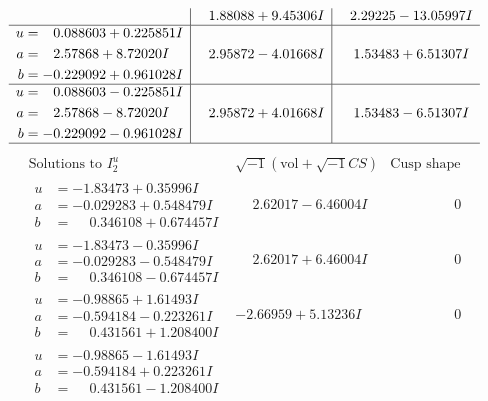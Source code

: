 \documentclass[1p]{elsarticle_modified}
\theoremstyle{definition}
\newcommand{\I}{\sqrt{-1}}
\begin{document}
$$\begin{array}{c|c|c}
 & \phantom{-}1.88088 + 9.45306 I & \phantom{-}2.29225 - 13.05997 I \\ \hline\begin{aligned}
u &= \phantom{-}0.088603 + 0.225851 I \\
a &= \phantom{-}2.57868 + 8.72020 I \\
b &= -0.229092 + 0.961028 I\end{aligned}
 & \phantom{-}2.95872 - 4.01668 I & \phantom{-}1.53483 + 6.51307 I \\ \hline\begin{aligned}
u &= \phantom{-}0.088603 - 0.225851 I \\
a &= \phantom{-}2.57868 - 8.72020 I \\
b &= -0.229092 - 0.961028 I\end{aligned}
 & \phantom{-}2.95872 + 4.01668 I & \phantom{-}1.53483 - 6.51307 I\\
 \hline 
 \end{array}$$\newpage$$\begin{array}{c|c|c}  
\text{Solutions to }I^u_{2}& \I (\text{vol} + \sqrt{-1}CS) & \text{Cusp shape}\\
 \hline 
\begin{aligned}
u &= -1.83473 + 0.35996 I \\
a &= -0.029283 + 0.548479 I \\
b &= \phantom{-}0.346108 + 0.674457 I\end{aligned}
 & \phantom{-}2.62017 - 6.46004 I & \phantom{-0.000000 } 0 \\ \hline\begin{aligned}
u &= -1.83473 - 0.35996 I \\
a &= -0.029283 - 0.548479 I \\
b &= \phantom{-}0.346108 - 0.674457 I\end{aligned}
 & \phantom{-}2.62017 + 6.46004 I & \phantom{-0.000000 } 0 \\ \hline\begin{aligned}
u &= -0.98865 + 1.61493 I \\
a &= -0.594184 - 0.223261 I \\
b &= \phantom{-}0.431561 + 1.208400 I\end{aligned}
 & -2.66959 + 5.13236 I & \phantom{-0.000000 } 0 \\ \hline\begin{aligned}
u &= -0.98865 - 1.61493 I \\
a &= -0.594184 + 0.223261 I \\
b &= \phantom{-}0.431561 - 1.208400 I\end{aligned}

\end{array}$$
\end{document}
